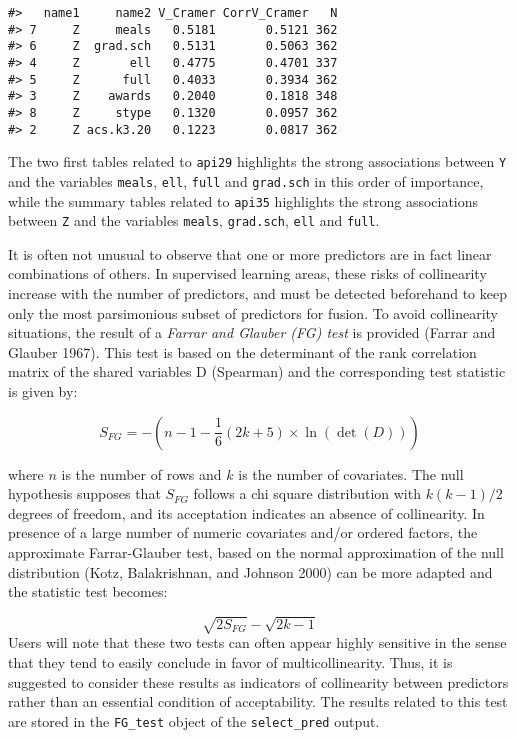 \begin{verbatim}
#>   name1     name2 V_Cramer CorrV_Cramer   N
#> 7     Z     meals   0.5181       0.5121 362
#> 6     Z  grad.sch   0.5131       0.5063 362
#> 4     Z       ell   0.4775       0.4701 337
#> 5     Z      full   0.4033       0.3934 362
#> 3     Z    awards   0.2040       0.1818 348
#> 8     Z     stype   0.1320       0.0957 362
#> 2     Z acs.k3.20   0.1223       0.0817 362
\end{verbatim}

The two first tables related to \texttt{api29} highlights the strong associations between \texttt{Y} and the variables \texttt{meals}, \texttt{ell}, \texttt{full} and \texttt{grad.sch} in this order of importance, while the summary tables related to \texttt{api35} highlights the strong associations between \texttt{Z} and the variables \texttt{meals}, \texttt{grad.sch}, \texttt{ell} and \texttt{full}.

It is often not unusual to observe that one or more predictors are in fact linear combinations of others. In
supervised learning areas, these risks of collinearity increase with the number of predictors, and must be detected beforehand to keep only the most parsimonious subset of predictors for fusion. To avoid collinearity situations, the result of a \emph{Farrar and Glauber (FG) test} is provided (Farrar and Glauber 1967). This test is based on the determinant of the rank correlation matrix of the shared variables D (Spearman) and the corresponding test statistic is given by:

\[
S_{FG} = - \left(n-1-\frac{1}{6} (2k+5)\times \ln(\det(D))\right)
\]

where \(n\) is the number of rows and \(k\) is the number of covariates. The null hypothesis supposes that
\(S_{FG}\) follows a chi square distribution with \(k(k-1)/2\) degrees of freedom, and its acceptation indicates an absence of collinearity. In presence of a large number of numeric covariates and/or ordered factors, the approximate Farrar-Glauber test, based on the normal approximation of the null distribution (Kotz, Balakrishnan, and Johnson 2000) can be more adapted and the statistic test becomes:

\[
\sqrt{2S_{FG}} - \sqrt{2k-1}
\]
Users will note that these two tests can often appear highly sensitive in the sense that they tend to easily conclude in favor of multicollinearity. Thus, it is suggested to consider these results as indicators of collinearity between predictors rather than an essential condition of acceptability. The results related to this test are stored in the \texttt{FG\_test} object of the \texttt{select\_pred} output.

